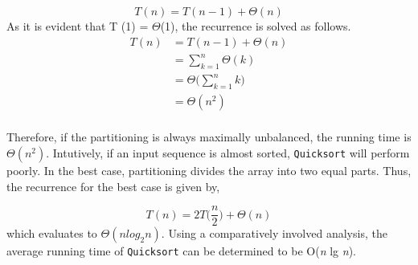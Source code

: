 \documentclass[a4paper, 10pt,twocolumn]{article}
\begin{document}
\begin{equation*}
T(n) = T(n-1) + \Theta(n)
\end{equation*}
As it is evident that T (1) = $\Theta$(1), the recurrence is solved as follows.
\begin{equation*}\begin{split}
T(n) &= T(n-1) + \Theta(n)\\
  &=\sum_{k=1}^n \Theta(k)\\
  &=\Theta\bigg(\sum_{k=1}^n k\bigg)\\
  &=\Theta(n^2)\\
\end{split}\end{equation*}
\par
Therefore, if the partitioning is always maximally unbalanced, the running time is $\Theta(n^2)$. Intutively, if an input sequence is almost sorted, \texttt{Quicksort} will perform poorly. In the best case, partitioning divides the array into two equal parts. Thus, the recurrence for the best case is given by,\par
\begin{equation*}
T(n) = 2T\bigg(\frac{n}{2}\bigg) + \Theta(n)
\end{equation*}
which evaluates to $\Theta(n log_2{n})$. Using a comparatively involved analysis, the average running time of \texttt{Quicksort} can be determined to be O(\textit{n} lg \textit{n}).
\end{document}
